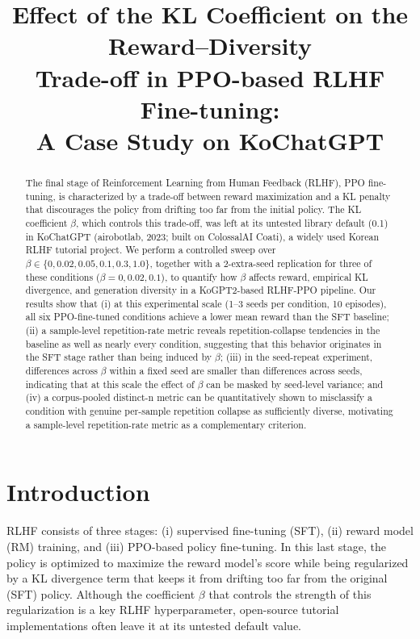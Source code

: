 \documentclass[conference]{IEEEtran}
\title{Effect of the KL Coefficient on the Reward--Diversity\\Trade-off in PPO-based RLHF Fine-tuning:\\A Case Study on KoChatGPT}
\author{
  \IEEEauthorblockN{Yongseok Oh}
  \IEEEauthorblockA{ysoh1113@gmail.com}
}
\begin{document}
\maketitle

\begin{abstract}
The final stage of Reinforcement Learning from Human Feedback (RLHF),
PPO fine-tuning, is characterized by a trade-off between reward
maximization and a KL penalty that discourages the policy from
drifting too far from the initial policy. The KL coefficient $\beta$,
which controls this trade-off, was left at its untested library
default (0.1) in KoChatGPT (airobotlab, 2023; built on ColossalAI
Coati), a widely used Korean RLHF tutorial project. We perform a
controlled sweep over $\beta \in \{0, 0.02, 0.05, 0.1, 0.3, 1.0\}$,
together with a 2-extra-seed replication for three of these conditions
($\beta{=}0, 0.02, 0.1$), to quantify how $\beta$ affects reward,
empirical KL divergence, and generation diversity in a KoGPT2-based
RLHF-PPO pipeline. Our results show that (i) at this experimental
scale (1--3 seeds per condition, 10 episodes), all six PPO-fine-tuned
conditions achieve a lower mean reward than the SFT baseline; (ii) a
sample-level repetition-rate metric reveals repetition-collapse
tendencies in the baseline as well as nearly every condition,
suggesting that this behavior originates in the SFT stage rather than
being induced by $\beta$; (iii) in the seed-repeat experiment,
differences across $\beta$ within a fixed seed are smaller than
differences across seeds, indicating that at this scale the effect of
$\beta$ can be masked by seed-level variance; and (iv) a corpus-pooled
distinct-n metric can be quantitatively shown to misclassify a
condition with genuine per-sample repetition collapse as sufficiently
diverse, motivating a sample-level repetition-rate metric as a
complementary criterion.
\end{abstract}

\section{Introduction}

RLHF consists of three stages: (i) supervised fine-tuning (SFT), (ii)
reward model (RM) training, and (iii) PPO-based policy fine-tuning. In
this last stage, the policy is optimized to maximize the reward
model's score while being regularized by a KL divergence term that
keeps it from drifting too far from the original (SFT) policy. Although
the coefficient $\beta$ that controls the strength of this
regularization is a key RLHF hyperparameter, open-source tutorial
implementations often leave it at its untested default value.
\end{document}

